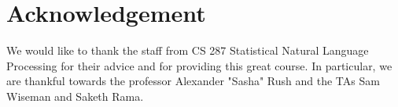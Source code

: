 \documentclass[twoside,11pt]{article}
\begin{document}
\section{Acknowledgement}

We would like to thank the staff from CS 287 Statistical Natural Language Processing for their advice and for providing this great course. In particular, we are thankful towards the professor Alexander "Sasha" Rush and the TAs Sam Wiseman and Saketh Rama.

\vskip 0.2in

\end{document}
